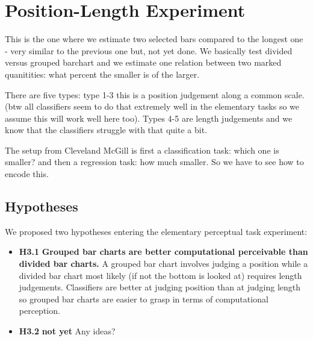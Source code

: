 \section{Position-Length Experiment}

This is the one where we estimate two selected bars compared to the longest one - very similar to the previous one but, not yet done. We basically test divided versus grouped barchart and we estimate one relation between two marked quanitities: what percent the smaller is of the larger.

There are five types: type 1-3 this is a position judgement along a common scale. (btw all classifiers seem to do that extremely well in the elementary tasks so we assume this will work well here too). Types 4-5 are length judgements and we know that the classifiers struggle with that quite a bit.

The setup from Cleveland McGill is first a classification task: which one is smaller? and then a regression task: how much smaller. So we have to see how to encode this.


\subsection{Hypotheses}

We proposed two hypotheses entering the elementary perceptual task experiment:

\begin{itemize}
	\item \textbf{H3.1} \textbf{Grouped bar charts are better computational perceivable than divided bar charts.} A grouped bar chart involves judging a position while a divided bar chart most likely (if not the bottom is looked at) requires length judgements. Classifiers are better at judging position than at judging length so grouped bar charts are easier to grasp in terms of computational perception.
	\item \textbf{H3.2} \textbf{not yet} Any ideas?
\end{itemize}


